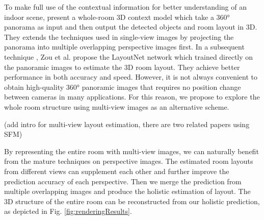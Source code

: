 To make full use of the contextual information for better understanding of an indoor scene, \cite{panocontext} present a whole-room 3D context model which take a \ang{360} panorama as input and then output the detected objects and room layout in 3D. They extends the techniques used in single-view images by projecting the panorama into multiple overlapping perspective images first. In a subsequent technique \cite{LayoutNet}, Zou et al. propose the LayoutNet network which trained directly on the panoramic images to estimate the 3D room layout. They achieve better performance in both accuracy and speed. However, it is not always convenient to obtain high-quality \ang{360} panoramic images that requires no position change between cameras in many applications. 
For this reason, we propose to explore the whole room structure using multi-view images  as an alternative scheme.

(add intro for multi-view layout estimation, there are two related papers using SFM) 


By representing the entire room with multi-view images, we can naturally benefit from the mature techniques on perspective images. The estimated room layouts from different views can supplement each other and further improve the prediction accuracy of each perspective. Then we merge the prediction from multiple overlapping images and produce the holistic estimation of layout. The 3D structure of the entire room can be reconstructed from our holistic prediction, as depicted in Fig. \ref{fig:renderingResults}.

